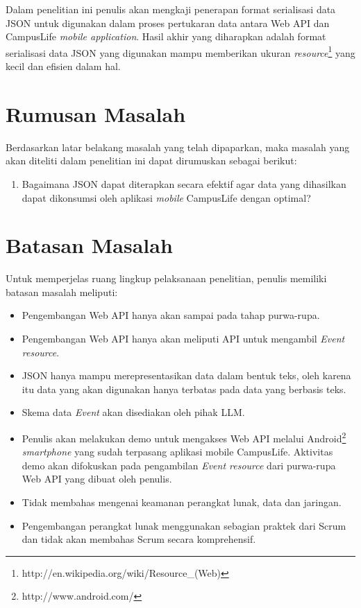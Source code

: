 \documentclass[a4paper, 12pt]{report}
\begin{document}
\onehalfspacing Dalam penelitian ini penulis akan mengkaji penerapan format serialisasi data JSON untuk digunakan dalam proses pertukaran data antara Web API dan CampusLife \textit{mobile application}. Hasil akhir yang diharapkan adalah format serialisasi data JSON yang digunakan mampu memberikan ukuran \textit{resource}\footnote{http://en.wikipedia.org/wiki/Resource\_(Web)} yang kecil dan efisien dalam hal.\cite{json-fat-free}

\section*{Rumusan Masalah}
\onehalfspacing Berdasarkan latar belakang masalah yang telah dipaparkan, maka masalah yang akan diteliti dalam penelitian ini dapat dirumuskan sebagai berikut:
\begin{enumerate}
  \item Bagaimana JSON dapat diterapkan secara efektif agar data yang dihasilkan dapat dikonsumsi oleh aplikasi \textit{mobile} CampusLife dengan optimal?
\end{enumerate}

\section*{Batasan Masalah}
\onehalfspacing Untuk memperjelas ruang lingkup pelaksanaan penelitian, penulis memiliki batasan masalah meliputi:
\onehalfspacing
\begin{itemize}
  \item Pengembangan Web API hanya akan sampai pada tahap purwa-rupa.
  \item Pengembangan Web API hanya akan meliputi API untuk mengambil \textit{Event resource}.
  \item JSON hanya mampu merepresentasikan data dalam bentuk teks, oleh karena itu data yang akan digunakan hanya terbatas pada data yang berbasis teks.
  \item Skema data \textit{Event} akan disediakan oleh pihak LLM.
  \item Penulis akan melakukan demo untuk mengakses Web API melalui Android\footnote{http://www.android.com/} \textit{smartphone} yang sudah terpasang aplikasi mobile CampusLife. Aktivitas demo akan difokuskan pada pengambilan \textit{Event resource} dari purwa-rupa Web API yang dibuat oleh penulis.
  \item Tidak membahas mengenai keamanan perangkat lunak, data dan jaringan.
  \item Pengembangan perangkat lunak menggunakan sebagian praktek dari Scrum dan tidak akan membahas Scrum secara komprehensif.
\end{itemize}
\end{document}
